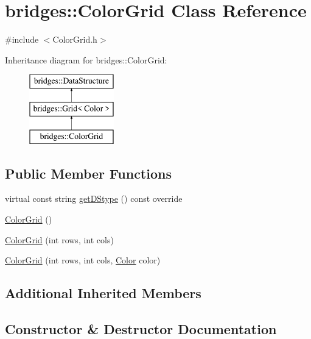 \hypertarget{classbridges_1_1_color_grid}{}\section{bridges\+:\+:Color\+Grid Class Reference}
\label{classbridges_1_1_color_grid}


{\ttfamily \#include $<$Color\+Grid.\+h$>$}

Inheritance diagram for bridges\+:\+:Color\+Grid\+:\begin{figure}[H]
\begin{center}
\leavevmode
\includegraphics[height=3.000000cm]{classbridges_1_1_color_grid}
\end{center}
\end{figure}
\subsection*{Public Member Functions}
\begin{DoxyCompactItemize}
\item 
virtual const string \mbox{\hyperlink{classbridges_1_1_color_grid_a6bb93994dade8e79a197459532dad153}{get\+D\+Stype}} () const override
\item 
\mbox{\hyperlink{classbridges_1_1_color_grid_a00f6ca6b903228b78538a9f0511ffe46}{Color\+Grid}} ()
\item 
\mbox{\hyperlink{classbridges_1_1_color_grid_ac5fb993701683939d96fd7ac6515efc3}{Color\+Grid}} (int rows, int cols)
\item 
\mbox{\hyperlink{classbridges_1_1_color_grid_a4b731632c040f1fb05636127627603d5}{Color\+Grid}} (int rows, int cols, \mbox{\hyperlink{classbridges_1_1_color}{Color}} color)
\end{DoxyCompactItemize}
\subsection*{Additional Inherited Members}


\subsection{Constructor \& Destructor Documentation}
\mbox{\label{classbridges_1_1_color_grid_a00f6ca6b903228b78538a9f0511ffe46}} 
